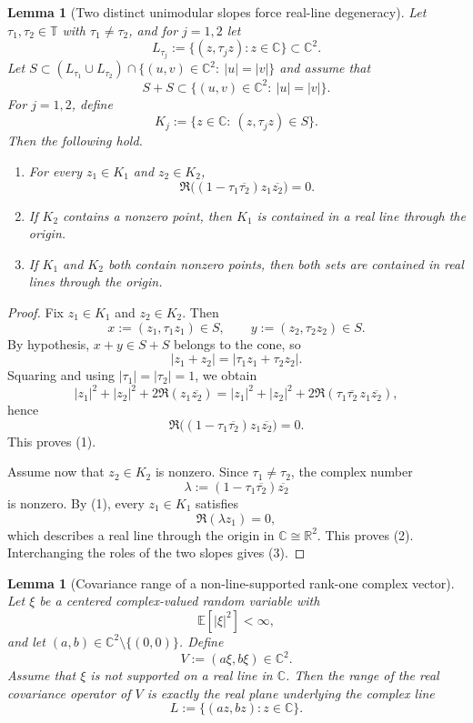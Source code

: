 \documentclass[11pt]{amsart}
\newtheorem{lemma}[theorem]{Lemma}
\newcommand{\E}{\mathbb{E}}
\newcommand{\C}{\mathbb{C}}
\newcommand{\R}{\mathbb{R}}
\newcommand{\T}{\mathbb{T}}
\begin{document}
\begin{lemma}[Two distinct unimodular slopes force real-line degeneracy]
\label{lem:two-slopes-real-degenerate}
Let $\tau_1,\tau_2\in\T$ with $\tau_1\ne \tau_2$, and for $j=1,2$ let
\[
  L_{\tau_j}:=\{(z,\tau_j z): z\in\C\}\subset \C^2.
\]
Let $S\subset (L_{\tau_1}\cup L_{\tau_2})\cap \{(u,v)\in\C^2:\ |u|=|v|\}$ and
assume that
\[
  S+S\subset \{(u,v)\in\C^2:\ |u|=|v|\}.
\]
For $j=1,2$, define
\[
  K_j:=\{z\in\C:\ (z,\tau_j z)\in S\}.
\]
Then the following hold.
\begin{enumerate}[label=\rm(\arabic*)]
\item For every $z_1\in K_1$ and $z_2\in K_2$,
  \[
    \Re\bigl((1-\tau_1\overline{\tau_2})z_1\overline{z_2}\bigr)=0.
  \]
\item If $K_2$ contains a nonzero point, then $K_1$ is contained in a real line
  through the origin.
\item If $K_1$ and $K_2$ both contain nonzero points, then both sets are
  contained in real lines through the origin.
\end{enumerate}
\end{lemma}

\begin{proof}
Fix $z_1\in K_1$ and $z_2\in K_2$.  Then
\[
  x:=(z_1,\tau_1 z_1)\in S,
  \qquad
  y:=(z_2,\tau_2 z_2)\in S.
\]
By hypothesis, $x+y\in S+S$ belongs to the cone, so
\[
  |z_1+z_2| = |\tau_1 z_1+\tau_2 z_2|.
\]
Squaring and using $|\tau_1|=|\tau_2|=1$, we obtain
\[
  |z_1|^2+|z_2|^2+2\Re(z_1\overline{z_2})
  =
  |z_1|^2+|z_2|^2+2\Re(\tau_1\overline{\tau_2}\,z_1\overline{z_2}),
\]
hence
\[
  \Re\bigl((1-\tau_1\overline{\tau_2})z_1\overline{z_2}\bigr)=0.
\]
This proves \textup{(1)}.

Assume now that $z_2\in K_2$ is nonzero.  Since $\tau_1\ne \tau_2$, the complex
number
\[
  \lambda:=(1-\tau_1\overline{\tau_2})\overline{z_2}
\]
is nonzero.  By \textup{(1)}, every $z_1\in K_1$ satisfies
\[
  \Re(\lambda z_1)=0,
\]
which describes a real line through the origin in $\C\cong \R^2$.  This proves
\textup{(2)}.  Interchanging the roles of the two slopes gives \textup{(3)}.
\end{proof}

\begin{lemma}[Covariance range of a non-line-supported rank-one complex vector]
\label{lem:cov-range-rank-one}
Let $\xi$ be a centered complex-valued random variable with
\[
  \E[|\xi|^2]<\infty,
\]
and let $(a,b)\in\C^2\setminus\{(0,0)\}$.  Define
\[
  V:=(a\xi,b\xi)\in\C^2.
\]
Assume that $\xi$ is not supported on a real line in $\C$.  Then the range of
the real covariance operator of $V$ is exactly the real plane underlying the
complex line
\[
  L:=\{(az,bz): z\in\C\}.
\]
\end{lemma}
\end{document}
